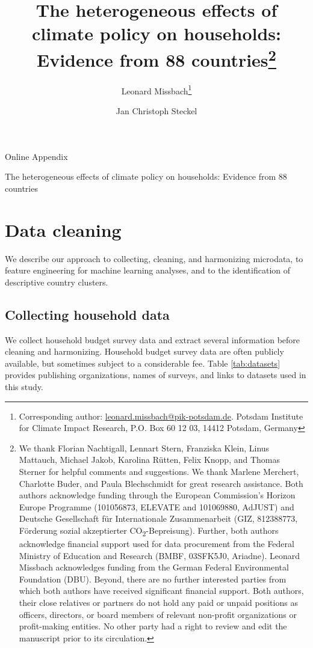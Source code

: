 \documentclass[12pt, a4paper]{article}
\title{The heterogeneous effects of climate policy on households: Evidence from 88 countries\footnote{We thank Florian Nachtigall, Lennart Stern, Franziska Klein, Linus Mattauch, Michael Jakob, Karolina Rütten, Felix Knopp, and Thomas Sterner for helpful comments and suggestions. We thank Marlene Merchert, Charlotte Buder, and Paula Blechschmidt for great research assistance. Both authors acknowledge funding through the European Commission’s Horizon Europe Programme (101056873, ELEVATE and 101069880, AdJUST) and Deutsche Gesellschaft für Internationale Zusammenarbeit (GIZ, 812388773, Förderung sozial akzeptierter CO\textsubscript{2}-Bepreisung). Further, both authors acknowledge financial support used for data procurement from the Federal Ministry of Education and Research (BMBF, 03SFK5J0, Ariadne). Leonard Missbach acknowledges funding from the German Federal Environmental Foundation (DBU). Beyond, there are no further interested parties from which both authors have received significant financial support. Both authors, their close relatives or partners do not hold any paid or unpaid positions as officers, directors, or board members of relevant non-profit organizations or profit-making entities. No other party had a right to review and edit the manuscript prior to its circulation.}}
\author[1]{Leonard Missbach\footnote{Corresponding author: \href{mailto:leonard.missbach@pik-potsdam.de}{leonard.missbach@pik-potsdam.de}. Potsdam Institute for Climate Impact Research, P.O. Box 60 12 03, 14412 Potsdam, Germany}}
\author[1,2]{Jan Christoph Steckel}
\affil[1]{\small Potsdam Institute for Climate Impact Research (PIK), Potsdam, Germany}
\affil[2]{\small Technical University of Munich, Munich, Germany}
\begin{document}

\vspace{30mm}



\thispagestyle{empty}

\linenumbers
\modulolinenumbers[5]

\setcounter{page}{1}

\appendix 
\begin{refsection}
{\Huge Online Appendix} \label{sec:appendix}

The heterogeneous effects of climate policy on households: Evidence from 88 countries

\clearpage
\section{Data cleaning} \label{sec:cleaning}

We describe our approach to collecting, cleaning, and harmonizing microdata, to feature engineering for machine learning analyses, and to the identification of descriptive country clusters.

\subsection{Collecting household data}\label{sec:cleaning_1}

We collect household budget survey data and extract several information before cleaning and harmonizing. Household budget survey data are often publicly available, but sometimes subject to a considerable fee. Table \ref{tab:datasets} provides publishing organizations, names of surveys, and links to datasets used in this study.


\end{refsection}
\end{document}
